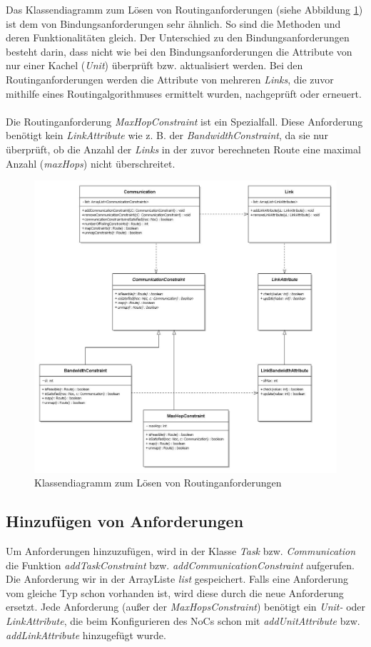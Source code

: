 Das Klassendiagramm zum Lösen von Routinganforderungen (siehe Abbildung \ref{fig:klRoute}) ist dem von Bindungsanforderungen sehr ähnlich. So sind die Methoden und deren Funktionalitäten gleich. Der Unterschied zu den Bindungsanforderungen besteht darin, dass nicht wie bei den Bindungsanforderungen die Attribute von nur einer Kachel (\textit{Unit}) überprüft bzw. aktualisiert werden. Bei den Routinganforderungen werden die Attribute von mehreren \textit{Links}, die zuvor mithilfe eines Routingalgorithmuses ermittelt  wurden, nachgeprüft oder erneuert. \\
\\
Die Routinganforderung \textit{MaxHopConstraint} ist ein Spezialfall. Diese Anforderung benötigt kein \textit{LinkAttribute} wie z. B. der  \textit{BandwidthConstraint}, da sie nur überprüft, ob die Anzahl der \textit{Links} in der zuvor berechneten Route eine maximal Anzahl (\textit{maxHops}) nicht überschreitet.
\begin{figure}[H]\centering
  \includegraphics[width = 150mm]{bilder/communication-link.jpg}
  \caption{Klassendiagramm zum Lösen von Routinganforderungen}\label{fig:klRoute}
\end{figure}

\subsection{Hinzufügen von Anforderungen}
Um Anforderungen hinzuzufügen, wird in der Klasse \textit{Task} bzw. \textit{Communication} die Funktion \textit{addTaskConstraint} bzw. \textit{addCommunicationConstraint} aufgerufen. Die Anforderung wir in der ArrayListe \textit{list} gespeichert. Falls eine Anforderung vom gleiche Typ schon vorhanden ist, wird diese durch die neue Anforderung ersetzt. Jede Anforderung (außer der \textit{MaxHopsConstraint}) benötigt ein \textit{Unit-} oder \textit{LinkAttribute}, die beim Konfigurieren des NoCs schon mit \textit{addUnitAttribute} bzw. \textit{addLinkAttribute} hinzugefügt wurde.

